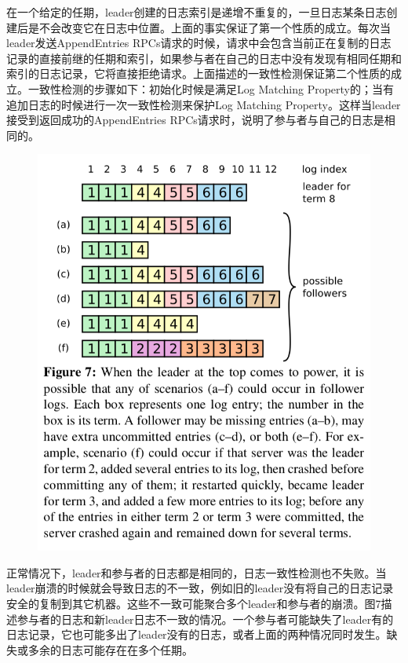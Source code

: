 \documentclass[journal]{IEEEtran}
\begin{document}
在一个给定的任期，leader创建的日志索引是递增不重复的，一旦日志某条日志创建后是不会改变它在日志中位置。上面的事实保证了第一个性质的成立。每次当leader发送AppendEntries RPCs请求的时候，请求中会包含当前正在复制的日志记录的直接前继的任期和索引，如果参与者在自己的日志中没有发现有相同任期和索引的日志记录，它将直接拒绝请求。上面描述的一致性检测保证第二个性质的成立。一致性检测的步骤如下：初始化时候是满足Log Matching Property的；当有追加日志的时候进行一次一致性检测来保护Log Matching Property。这样当leader接受到返回成功的AppendEntries RPCs请求时，说明了参与者与自己的日志是相同的。
\begin{figure}[htbp]
\begin{center}
\includegraphics[width=1\linewidth]{./fig7.png}
\end{center}
\end{figure}

正常情况下，leader和参与者的日志都是相同的，日志一致性检测也不失败。当leader崩溃的时候就会导致日志的不一致，例如旧的leader没有将自己的日志记录安全的复制到其它机器。这些不一致可能聚合多个leader和参与者的崩溃。图7描述参与者的日志和新leader日志不一致的情况。一个参与者可能缺失了leader有的日志记录，它也可能多出了leader没有的日志，或者上面的两种情况同时发生。缺失或多余的日志可能存在在多个任期。
\end{document}

